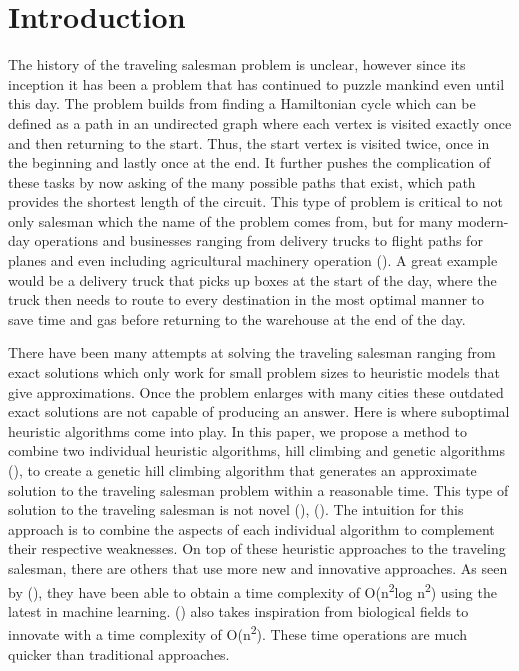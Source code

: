 \documentclass[sigplan,screen]{acmart}
\begin{document}
\maketitle

\section{Introduction}
The history of the traveling salesman problem is unclear, however since its
inception it has been a problem that has continued to puzzle mankind even until
this day. The problem builds from finding a Hamiltonian cycle which can be
defined as a path in an undirected graph where each vertex is visited exactly
once and then returning to the start. Thus, the start vertex is visited twice,
once in the beginning and lastly once at the end. It further pushes the
complication of these tasks by now asking of the many possible paths that exist,
which path provides the shortest length of the circuit. This type of problem is
critical to not only salesman which the name of the problem comes from, but for
many modern-day operations and businesses ranging from delivery trucks to flight
paths for planes and even including agricultural machinery operation
(\citet{liao_research_2021}). A great example would be a delivery truck that picks
up boxes at the start of the day, where the truck then needs to route to every
destination in the most optimal manner to save time and gas before returning to
the warehouse at the end of the day.

There have been many attempts at solving the traveling salesman ranging from
exact solutions which only work for small problem sizes to heuristic models that
give approximations. Once the problem enlarges with many cities these outdated
exact solutions are not capable of producing an answer. Here is where suboptimal
heuristic algorithms come into play. In this paper, we propose a method to
combine two individual heuristic algorithms, hill climbing and genetic algorithms
(\citet{harik_compact_1999}), to create a genetic hill climbing algorithm that
generates an approximate solution to the traveling salesman problem within a
reasonable time. This type of solution to the traveling salesman is not novel
(\citet{yuret_2014}), (\citet{wang_hybrid_2011}). The intuition for this approach is
to combine the aspects of each individual algorithm to complement their
respective weaknesses. On top of these heuristic approaches to the traveling
salesman, there are others that use more new and innovative approaches. As seen
by (\citet{mele_new_2021}), they have been able to obtain a time complexity of
O(n\textsuperscript{2}log n\textsuperscript{2}) using the latest in machine
learning. (\citet{ren_parallel_2020}) also takes inspiration from biological
fields to innovate with a time complexity of O(n\textsuperscript{2}). These time
operations are much quicker than traditional approaches.
\end{document}
